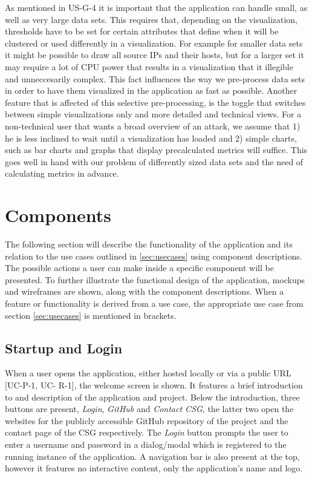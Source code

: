 As mentioned in US-G-4 it is important that the application can handle small, as well as very large data sets. This requires that, depending on the visualization, thresholds have to be set for certain attributes that define when it will be clustered or used differently in a visualization. For example for smaller data sets it might be possible to draw all source IPs and their hosts, but for a larger set it may require a lot of CPU power that results in a visualization that it illegible and unneccesarily complex. This fact influences the way we pre-process data sets in order to have them visualized in the application as fast as possible. Another feature that is affected of this selective pre-processing, is the toggle that switches between simple visualizations only and more detailed and technical views. For a non-technical user that wants a broad overview of an attack, we assume that 1) he is less inclined to wait until a visualization has loaded and 2) simple charts, such as bar charts and graphs that display precalculated metrics will suffice. This goes well in hand with our problem of differently sized data sets and the need of calculating metrics in advance.


\section{Components}\label{components}
The following section will describe the functionality of the application and its relation to the use cases outlined in \ref{sec:usecases} using component descriptions. The possible actions a user can make inside a specific component will be presented. To further illustrate the functional design of the application, mockups and wireframes are shown, along with the component descriptions. When a feature or functionality is derived from a use case, the appropriate use case from section \ref{sec:usecases} is mentioned in brackets.

\subsection{Startup and Login}
When a user opens the application, either hosted locally or via a public URL [UC-P-1, UC- R-1], the welcome screen is shown. It features a brief introduction to and description of the application and project. Below the introduction, three buttons are present, \emph{Login}, \emph{GitHub} and \emph{Contact CSG}, the latter two open the websites for the publicly accessible GitHub repository of the project and the contact page of the CSG respectively. The \emph{Login} button prompts the user to enter a username and password in a dialog/modal which is registered to the running instance of the application. A navigation bar is also present at the top, however it features no interactive content, only the application's name and logo.

